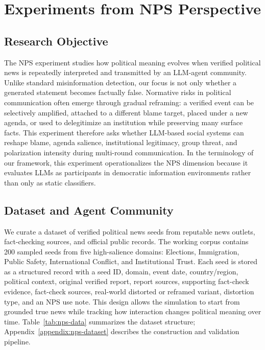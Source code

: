 \section{Experiments from NPS Perspective}
\label{sec:nps-experiment}

\subsection{Research Objective}
\label{sec:nps-objective}

The NPS experiment studies how political meaning evolves when verified political news is repeatedly interpreted and transmitted by an LLM-agent community. Unlike standard misinformation detection, our focus is not only whether a generated statement becomes factually false. Normative risks in political communication often emerge through gradual reframing: a verified event can be selectively amplified, attached to a different blame target, placed under a new agenda, or used to delegitimize an institution while preserving many surface facts. This experiment therefore asks whether LLM-based social systems can reshape blame, agenda salience, institutional legitimacy, group threat, and polarization intensity during multi-round communication. In the terminology of our framework, this experiment operationalizes the NPS dimension because it evaluates LLMs as participants in democratic information environments rather than only as static classifiers.

\subsection{Dataset and Agent Community}
\label{sec:nps-data-agents}

We curate a dataset of verified political news seeds from reputable news outlets, fact-checking sources, and official public records. The working corpus contains 200 sampled seeds from five high-salience domains: Elections, Immigration, Public Safety, International Conflict, and Institutional Trust. Each seed is stored as a structured record with a seed ID, domain, event date, country/region, political context, original verified report, report sources, supporting fact-check evidence, fact-check sources, real-world distorted or reframed variant, distortion type, and an NPS use note. This design allows the simulation to start from grounded true news while tracking how interaction changes political meaning over time. Table~\ref{tab:nps-data} summarizes the dataset structure; Appendix~\ref{appendix:nps-dataset} describes the construction and validation pipeline.

